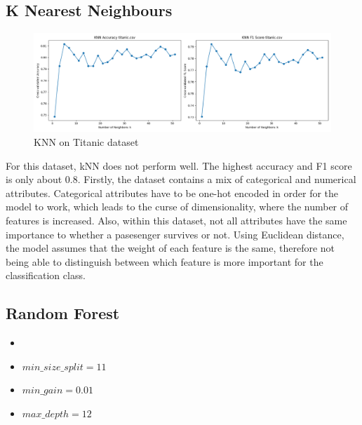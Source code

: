 \documentclass[letterpaper]{article}
\begin{document}
\subsection*{K Nearest Neighbours}
\begin{figure}[H]
	\includegraphics[width=\textwidth]{figures/knn_titanic.csv.png}
	\caption{KNN on Titanic dataset}
	\label{fig:knn-titanic}
\end{figure}
For this dataset, kNN does not perform well. The highest accuracy and F1 score is only about 0.8. 
Firstly, the dataset contains a mix of categorical and numerical attributes. Categorical attributes have to be one-hot encoded in order for the model to work, which leads to the curse of dimensionality, where the number of features is increased. 
Also, within this dataset, not all attributes have the same importance to whether a pasesenger survives or not. Using Euclidean distance, the model assumes that the weight of each feature is the same, therefore not being able to distinguish between which feature is more important for the classification class.

\subsection*{Random Forest}
\begin{itemize}
	\item {}
	\item $min\_size\_split = 11$
	\item $min\_gain = 0.01$
	\item $max\_depth = 12$
\end{itemize}
\end{document}
